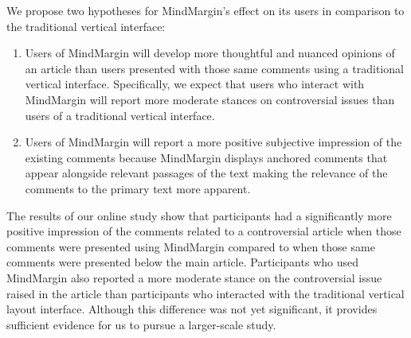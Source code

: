 

We propose two hypotheses for MindMargin's effect on its users in comparison to the traditional vertical interface:
\begin{enumerate}
\item Users of MindMargin will develop more thoughtful and nuanced opinions of an article than users presented with those same comments using a traditional vertical interface. %
Specifically, we expect that users who interact with MindMargin will report more moderate stances on controversial issues than users of a traditional vertical interface.
\item Users of MindMargin will report a more positive subjective impression of the existing comments because MindMargin displays anchored comments that appear alongside relevant passages of the text making the relevance of the comments to the primary text more apparent.
\end{enumerate}


The results of our online study show that participants had a significantly more positive impression of the comments related to a controversial article when those comments were presented using MindMargin compared to when those same comments were presented below the main article.  Participants who used MindMargin also reported a more moderate stance on the controversial issue raised in the article than participants who interacted with the traditional vertical layout interface.  Although this difference was not yet significant, it provides sufficient evidence for us to pursue a larger-scale study.


